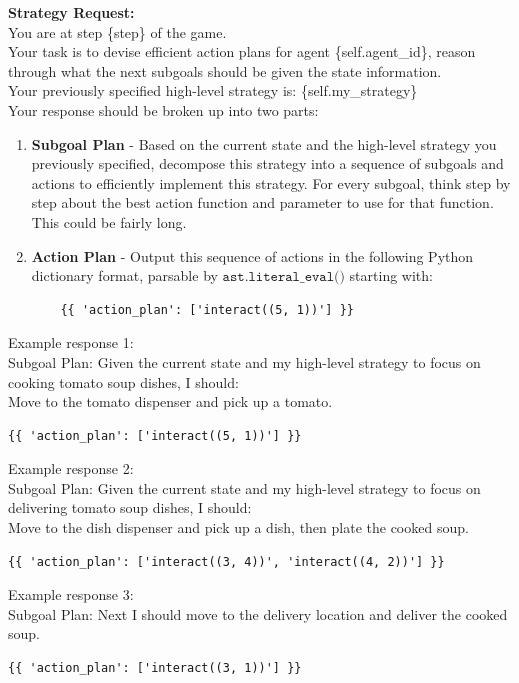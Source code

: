 \documentclass{article} %
\begin{document}
\begin{tcolorbox}[
    title={\small \textbf{Subgoal Module Message}},
    width=\linewidth, %
    fontupper=\fontsize{9pt}{11pt}\selectfont\ttfamily
]
\textbf{Strategy Request:}\\
You are at step \{step\} of the game.\\
Your task is to devise efficient action plans for agent \{self.agent\_id\}, reason through what the next subgoals should be given the state information.\\
Your previously specified high-level strategy is: \{self.my\_strategy\}\\
Your response should be broken up into two parts:\\
\begin{enumerate}
    \item \textbf{Subgoal Plan} - Based on the current state and the high-level strategy you previously specified, decompose this strategy into a sequence of subgoals and actions to efficiently implement this strategy. For every subgoal, think step by step about the best action function and parameter to use for that function. This could be fairly long.
    \item \textbf{Action Plan} - Output this sequence of actions in the following Python dictionary format, parsable by $\texttt{ast.literal\_eval()}$ starting with:
    \begin{verbatim}
    {{ 'action_plan': ['interact((5, 1))'] }}
    \end{verbatim}
\end{enumerate}
Example response 1:\\
Subgoal Plan: Given the current state and my high-level strategy to focus on cooking tomato soup dishes, I should:\\
Move to the tomato dispenser and pick up a tomato.\\
\begin{verbatim}
{{ 'action_plan': ['interact((5, 1))'] }}
\end{verbatim}
Example response 2:\\
Subgoal Plan: Given the current state and my high-level strategy to focus on delivering tomato soup dishes, I should:\\
Move to the dish dispenser and pick up a dish, then plate the cooked soup.\\
\begin{verbatim}
{{ 'action_plan': ['interact((3, 4))', 'interact((4, 2))'] }}
\end{verbatim}
Example response 3:\\
Subgoal Plan: Next I should move to the delivery location and deliver the cooked soup.\\
\begin{verbatim}
{{ 'action_plan': ['interact((3, 1))'] }}
\end{verbatim}

\end{tcolorbox}
\end{document}
